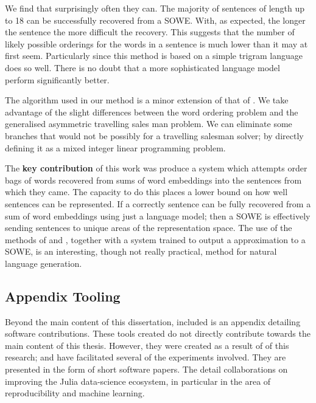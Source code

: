 \documentclass{book}
\begin{document}
We find that surprisingly often they can.
The majority of sentences of length up to 18 can be successfully recovered from a SOWE.
With, as expected, the longer the sentence the more difficult the recovery.
This suggests that the number of likely possible orderings for the words in a sentence is much lower than it may at first seem.
Particularly since this method is based on a simple trigram language does so well.
There is no doubt that a more sophisticated language model perform significantly better.


The algorithm used in our method is a minor extension of that of \citet{Horvat2014}.
We take advantage of the slight differences between the word ordering problem and the generalised asymmetric travelling sales man problem.
We can eliminate some branches that would not be possibly for a travelling salesman solver; by directly defining it as a mixed integer linear programming problem.


The \textbf{key contribution} of this work was produce a system which attempts order bags of words recovered from sums of word embeddings into the sentences from which they came.
The capacity to do this places a lower bound on how well sentences can be represented.
If a correctly sentence can be fully recovered from a sum of word embeddings using just a language model;
then a SOWE is effectively sending sentences to unique areas of the representation space.
The use of the methods of  and ,
together with a system trained to output a approximation to a SOWE, is an interesting, though not really practical, method for natural language generation.

\subsection{ Appendix Tooling}
Beyond the main content of this dissertation,
included is an appendix detailing software contributions.
These tools created do not directly contribute towards the main content of this thesis.
However, they were created as a result of of this research;
and have facilitated several of the experiments involved.
They are presented in the form of short software papers.
The detail collaborations on improving the Julia \citep{Julia} data-science ecosystem,
in particular in the area of reproducibility and machine learning.
\end{document}
